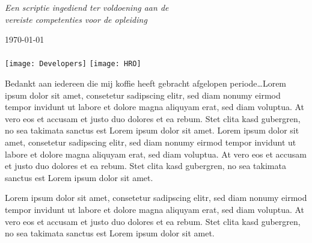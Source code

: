 \documentclass[
11pt, %
english, %
singlespacing, %
headsepline, %
]{formatting} %
\begin{document}
\begin{titlepage}
\begin{center}
		\vfill
		
		\large \textit{Een scriptie ingediend ter voldoening aan de\\ vereiste competenties voor de opleiding \degreename}\\[0.3cm]
		
		\deptname %
		
		\vfill
		
		{\large \today}\\[0.5cm] %
		{\Large \texttt{\versionnr}}\\[1cm]
		
		\texttt{[image: Developers]} \hspace{3cm}
		\texttt{[image: HRO]}

		\vfill
	\end{center}
\end{titlepage}


\begin{voorwoord}
	Bedankt aan iedereen die mij koffie heeft gebracht afgelopen periode\ldots Lorem ipsum dolor sit amet, consetetur sadipscing elitr, sed diam nonumy eirmod tempor invidunt ut labore et dolore magna aliquyam erat, sed diam voluptua. At vero eos et accusam et justo duo dolores et ea rebum. Stet clita kasd gubergren, no sea takimata sanctus est Lorem ipsum dolor sit amet. Lorem ipsum dolor sit amet, consetetur sadipscing elitr, sed diam nonumy eirmod tempor invidunt ut labore et dolore magna aliquyam erat, sed diam voluptua. At vero eos et accusam et justo duo dolores et ea rebum. Stet clita kasd gubergren, no sea takimata sanctus est Lorem ipsum dolor sit amet. 
	
	Lorem ipsum dolor sit amet, consetetur sadipscing elitr, sed diam nonumy eirmod tempor invidunt ut labore et dolore magna aliquyam erat, sed diam voluptua. At vero eos et accusam et justo duo dolores et ea rebum. Stet clita kasd gubergren, no sea takimata sanctus est Lorem ipsum dolor sit amet.
\end{voorwoord}

\end{document}

